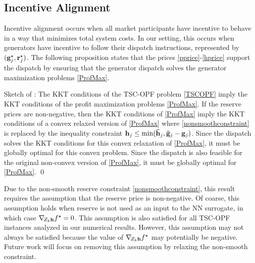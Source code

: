 \documentclass[lettersize,journal]{IEEEtran}
\begin{document}
\subsection{Incentive Alignment}\label{sec:incentives}
Incentive alignment occurs when all market participants have incentive to behave in a way that minimizes total system costs.  In our setting, this occurs when generators have incentive to follow their dispatch instructions, represented by $(\bold{g}_j^{\star},\bold{r}_j^{\star})$.  The following proposition states that the prices \eqref{pprice}-\eqref{hprice} support the dispatch by ensuring that the generator dispatch solves the generator maximization problems \eqref{ProfMax}.

 \normalfont

Sketch of \proofname:  
The KKT conditions of the TSC-OPF problem \eqref{TSCOPF} imply the KKT conditions of the profit maximization problems \eqref{ProfMax}.  If the reserve prices are non-negative, then the KKT conditions of \eqref{ProfMax} imply the KKT conditions of a convex relaxed version of \eqref{ProfMax} where \eqref{nonsmoothconstraint} is replaced by the inequality constraint \mbox{$\bold{h}_j \leq \min(\bold{\bar{h}}_j,\bold{\bar{g}}_j-\bold{g}_j)$}.  Since the dispatch solves the KKT conditions for this convex relaxation of \eqref{ProfMax}, it must be globally optimal for this convex problem.  Since the dispatch is also feasible for the original non-convex version of \eqref{ProfMax}, it must be globally optimal for \eqref{ProfMax}. \qed

Due to the non-smooth reserve constraint \eqref{nonsmoothconstraint}, this result requires the assumption that the reserve price is non-negative.  Of coarse, this assumption holds when reserve is not used as an input to the NN surrogate, in which case $\nabla_{\!Z_k \bold{h}} f^{\star}=0$.  This assumption is also satisfied for all TSC-OPF instances analyzed in our numerical results.  However, this assumption may not always be satisfied because the value of $\nabla_{\!Z_k \bold{h}} f^{\star}$ may potentially be negative.  Future work will focus on removing this assumption by relaxing the non-smooth constraint.
\end{document}
